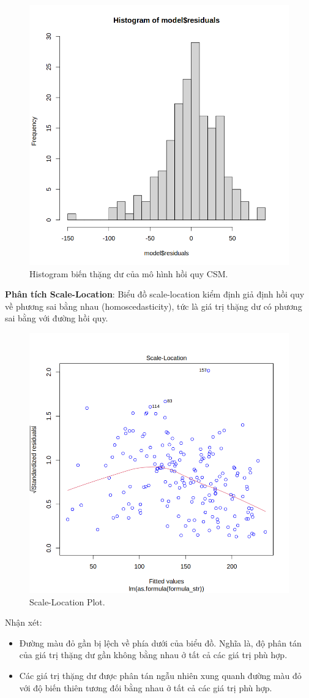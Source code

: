 \begin{figure}[H]
    \centering
    \includegraphics[width=0.75\columnwidth]{csm_figures/best_csm_model_qq2.png}
    \caption{Histogram biến thặng dư của mô hình hồi quy CSM.}
    \label{fig:best_csm_model_qq2}
\end{figure}

\textbf{Phân tích Scale-Location}: Biểu đồ scale-location kiểm định giả định hồi quy về phương sai bằng nhau (homoscedasticity), tức là giá trị thặng dư có phương sai bằng với đường hồi quy.

\begin{figure}[H]
    \centering
    \includegraphics[width=0.75\columnwidth]{csm_figures/best_csm_model_scale.png}
    \caption{Scale-Location Plot.}
    \label{fig:best_csm_model_scale}
\end{figure}
Nhận xét:
\begin{itemize}
    \item Đường màu đỏ gần bị lệch về phía dưới của biểu đồ. Nghĩa là, độ phân tán của giá trị thặng dư gần không bằng nhau ở tất cả các giá trị phù hợp. 
    \item  Các giá trị thặng dư được phân tán ngẫu nhiên xung quanh đường màu đỏ với độ biến thiên tương đối bằng nhau ở tất cả các giá trị phù hợp.
\end{itemize}

